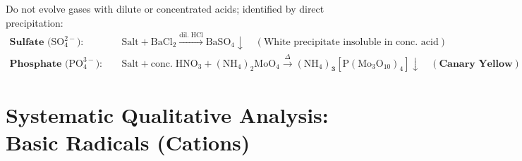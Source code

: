 \documentclass[10pt,a4paper]{article}
\begin{document}
\begin{formulabox}
Do not evolve gases with dilute or concentrated acids; identified by direct precipitation:
\begin{align*}
  \textbf{Sulfate } (\mathrm{SO_4^{2-}): } \quad & \text{Salt} + \mathrm{BaCl_2} \xrightarrow{\mathrm{dil.\; HCl}} \mathbf{\mathrm{BaSO_4} \downarrow} \quad (\text{White precipitate insoluble in conc. acid})\\
  \textbf{Phosphate } (\mathrm{PO_4^{3-}): } \quad & \text{Salt} + \mathrm{conc.\; HNO_3} + (\mathrm{NH_4})_2\mathrm{MoO_4} \xrightarrow{\Delta} \mathbf{(\mathrm{NH_4})_3[\mathrm{P(Mo_{3}O_{10})_4}] \downarrow} \quad (\textbf{Canary Yellow})
\end{align*}
\end{formulabox}

\section{Systematic Qualitative Analysis: Basic Radicals (Cations)}
\end{document}
